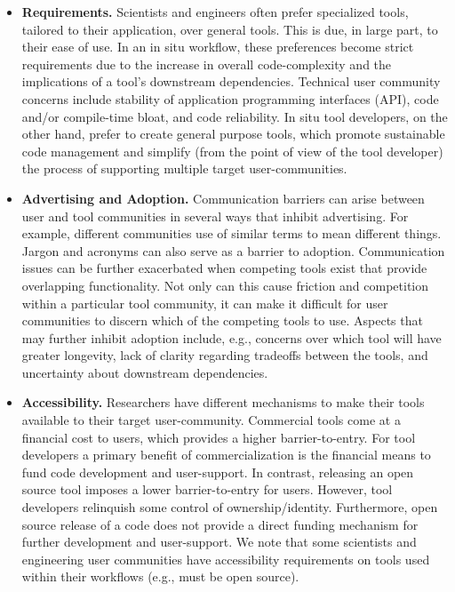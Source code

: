 \begin{itemize}
\item \textbf{\sffamily Requirements.} Scientists and engineers often prefer specialized tools, tailored to their application, over general tools.  This is due, in large part, to their ease of use. In an in situ workflow,  these preferences become strict requirements due to the increase in overall code-complexity and the implications of a tool’s downstream dependencies. Technical user community concerns include stability of application programming interfaces (API), code and/or compile-time bloat, and code reliability. In situ tool developers, on the other hand, prefer to create general purpose tools, which promote sustainable code management and simplify (from the point of view of the tool developer) the process of supporting multiple target user-communities.

\item \textbf{\sffamily Advertising and Adoption.} Communication barriers can arise between user and tool communities in several ways that inhibit advertising. For example, different communities use of similar terms to mean different things.  Jargon and acronyms can also serve as a barrier to adoption.   Communication issues can be further exacerbated when competing tools exist that provide overlapping  functionality. Not only can this cause friction and competition within a particular tool community, it can make it difficult for user communities to discern which of the competing tools to use.  Aspects that may further inhibit adoption include, e.g., concerns over which tool will have greater longevity, lack of clarity regarding tradeoffs between the tools, and uncertainty about downstream dependencies.  

\item \textbf{\sffamily Accessibility.} Researchers have different mechanisms to make their tools available to their target user-community.  Commercial tools come at a financial cost to users, which provides a higher barrier-to-entry.  For tool developers a primary benefit of commercialization is the financial means to fund code development and user-support. In contrast, releasing an open source tool imposes a lower barrier-to-entry for users.  However, tool developers relinquish some control of ownership/identity. Furthermore, open source release of a code does not provide a direct funding mechanism for further development and user-support. We note that some scientists and engineering user communities have accessibility requirements on tools used within their workflows (e.g., must be open source).
\end{itemize}

